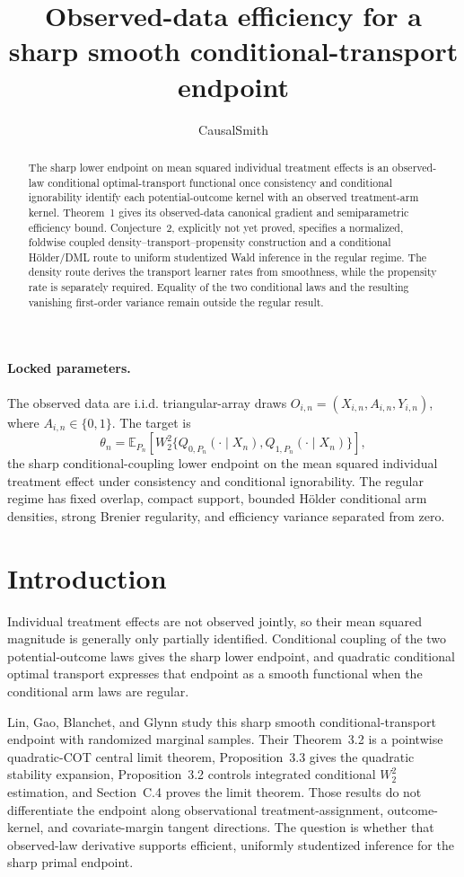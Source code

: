 \documentclass[11pt]{article}
\title{Observed-data efficiency for a sharp smooth conditional-transport endpoint}
\author{CausalSmith}
\date{}
\newcommand{\E}{\mathbb{E}}
\begin{document}
\maketitle

\paragraph{Locked parameters.}
The observed data are i.i.d. triangular-array draws
\(O_{i,n}=(X_{i,n},A_{i,n},Y_{i,n})\), where \(A_{i,n}\in\{0,1\}\).
The target is
\[
 \theta_n=\E_{P_n}\!\left[W_2^2\{Q_{0,P_n}(\cdot\mid X_n),Q_{1,P_n}(\cdot\mid X_n)\}\right],
\]
the sharp conditional-coupling lower endpoint on the mean squared individual treatment effect under consistency and conditional ignorability. The regular regime has fixed overlap, compact support, bounded Hölder conditional arm densities, strong Brenier regularity, and efficiency variance separated from zero.

\begin{abstract}
The sharp lower endpoint on mean squared individual treatment effects is an observed-law conditional optimal-transport functional once consistency and conditional ignorability identify each potential-outcome kernel with an observed treatment-arm kernel. Theorem~1 gives its observed-data canonical gradient and semiparametric efficiency bound. Conjecture~2, explicitly not yet proved, specifies a normalized, foldwise coupled density--transport--propensity construction and a conditional Hölder/DML route to uniform studentized Wald inference in the regular regime. The density route derives the transport learner rates from smoothness, while the propensity rate is separately required. Equality of the two conditional laws and the resulting vanishing first-order variance remain outside the regular result.
\end{abstract}

\section{Introduction}
Individual treatment effects are not observed jointly, so their mean squared magnitude is generally only partially identified. Conditional coupling of the two potential-outcome laws gives the sharp lower endpoint, and quadratic conditional optimal transport expresses that endpoint as a smooth functional when the conditional arm laws are regular.

Lin, Gao, Blanchet, and Glynn \citep{lin2026statistical} study this sharp smooth conditional-transport endpoint with randomized marginal samples. Their Theorem~3.2 is a pointwise quadratic-COT central limit theorem, Proposition~3.3 gives the quadratic stability expansion, Proposition~3.2 controls integrated conditional \(W_2^2\) estimation, and Section~C.4 proves the limit theorem. Those results do not differentiate the endpoint along observational treatment-assignment, outcome-kernel, and covariate-margin tangent directions. The question is whether that observed-law derivative supports efficient, uniformly studentized inference for the sharp primal endpoint.
\end{document}
